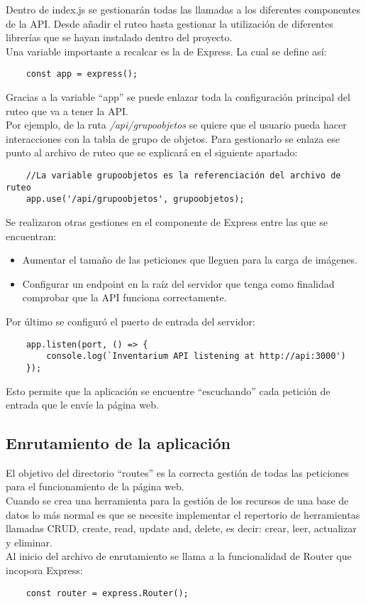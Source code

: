 Dentro de index.js se gestionarán todas las llamadas a los diferentes componentes de la API. Desde añadir el ruteo hasta gestionar la utilización de diferentes librerías que se hayan instalado dentro del proyecto.
\\Una variable importante a recalcar es la de Express. La cual se define así:
\begin{verbatim}
    const app = express();
\end{verbatim}
Gracias a la variable ``app'' se puede enlazar toda la configuración principal del ruteo que va a tener la API.
\\Por ejemplo, de la ruta \textit{/api/grupoobjetos} se quiere que el usuario pueda hacer interacciones con la tabla de grupo de objetos. Para gestionarlo se enlaza ese punto al archivo de ruteo que se explicará en el siguiente apartado:
\begin{verbatim}
    //La variable grupoobjetos es la referenciación del archivo de ruteo
    app.use('/api/grupoobjetos', grupoobjetos); 
\end{verbatim}
Se realizaron otras gestiones en el componente de Express entre las que se encuentran:
\begin{itemize}
    \item Aumentar el tamaño de las peticiones que lleguen para la carga de imágenes.
    \item Configurar un endpoint en la raíz del servidor que tenga como finalidad comprobar que la API funciona correctamente.
\end{itemize}
Por último se configuró el puerto de entrada del servidor:
\begin{verbatim}
    app.listen(port, () => {
        console.log(`Inventarium API listening at http://api:3000')
    });
\end{verbatim}
Esto permite que la aplicación se encuentre ``escuchando'' cada petición de entrada que le envíe la página web.

\subsection{Enrutamiento de la aplicación}
El objetivo del directorio ``routes'' es la correcta gestión de todas las peticiones para el funcionamiento de la página web.
\\Cuando se crea una herramienta para la gestión de los recursos de una base de datos lo más normal es que se necesite implementar el repertorio de herramientas llamadas CRUD, create, read, update and, delete, es decir: crear, leer, actualizar y eliminar.
\\Al inicio del archivo de enrutamiento se llama a la funcionalidad de Router que incopora Express:
\begin{verbatim}
    const router = express.Router();
\end{verbatim}

